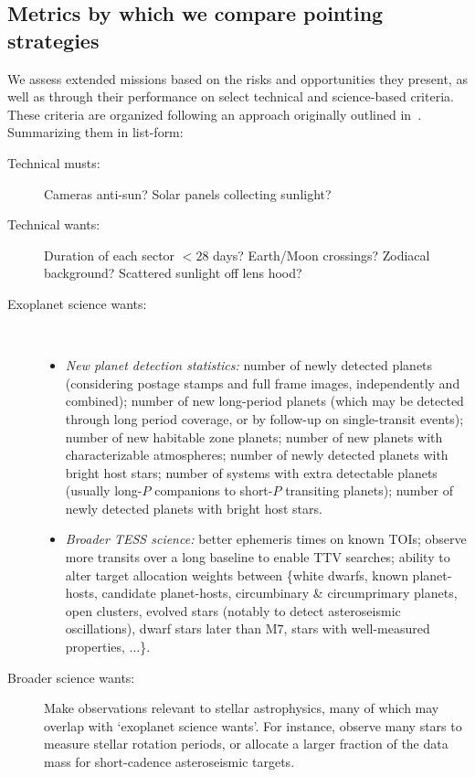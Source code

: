 \subsection{Metrics by which we compare pointing strategies}
\label{sec:comparing_pointing_strategies}

We assess extended missions based on the risks and opportunities they present, as well as through their performance on select technical and science-based criteria.
These criteria are organized following an approach originally outlined in~\citet{kepner_rational_1965}.
Summarizing them in list-form:
\begin{description}
	\item[Technical musts:] Cameras anti-sun? Solar panels collecting sunlight?
	\item[Technical wants:] Duration of each sector $<28$ days? Earth/Moon crossings? Zodiacal background? Scattered sunlight off lens hood?
	\item[Exoplanet science wants:]\
	\begin{itemize}
		\item \textit{New planet detection statistics:} 
		number of newly detected planets (considering postage stamps and full frame images, independently and combined); 
		number of new long-period planets (which may be detected through long period coverage, or by follow-up on single-transit events); 
		number of new habitable zone planets; 
		number of new planets with characterizable atmospheres; 
		number of newly detected planets with bright host stars; 
		number of systems with extra detectable planets (usually long-$P$ companions to short-$P$ transiting planets);
		number of newly detected planets with bright host stars.
		\item \textit{Broader TESS science:}
		better ephemeris times on known TOIs;
		observe more transits over a long baseline to enable TTV searches; 
		ability to alter target allocation weights between \{white dwarfs, known planet-hosts, candidate planet-hosts, circumbinary \& circumprimary planets, open clusters, evolved stars (notably to detect asteroseismic oscillations), dwarf stars later than M7, stars with well-measured properties, $\ldots$\}.
	\end{itemize}
	\item[Broader science wants:]
	Make observations relevant to stellar astrophysics, many of which may overlap with `exoplanet science wants'. For instance, observe many stars to measure stellar rotation periods, or allocate a larger fraction of the data mass for short-cadence asteroseismic targets.

\end{description}
